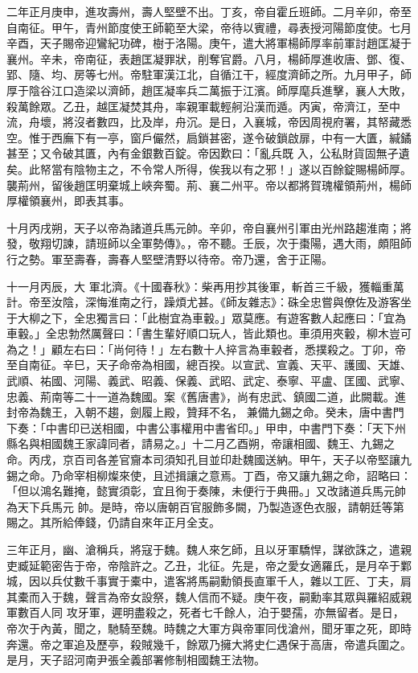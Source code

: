 \begin{pinyinscope}
 二年正月庚申，進攻壽州，壽人堅壁不出。丁亥，帝自霍丘班師。二月辛卯，帝至自南征。甲午，青州節度使王師範至大梁，帝待以賓禮，尋表授河陽節度使。七月辛酉，天子賜帝迎鸞紀功碑，樹于洛陽。庚午，遣大將軍楊師厚率前軍討趙匡凝于襄州。辛未，帝南征，表趙匡凝罪狀，削奪官爵。八月，楊師厚進收唐、鄧、復、
 郢、隨、均、房等七州。帝駐軍漢江北，自循江干，經度濟師之所。九月甲子，師厚于陰谷江口造梁以濟師，趙匡凝率兵二萬振于江濱。師厚麾兵進擊，襄人大敗，殺萬餘眾。乙丑，越匡凝焚其舟，率親軍載輕舸沿漢而遁。丙寅，帝濟江，至中流，舟壞，將沒者數四，比及岸，舟沉。是日，入襄城，帝因周視府署，其帑藏悉空。惟于西廡下有一亭，窗戶儼然，扃鎖甚密，遂令破鎖啟扉，中有一大匱，緘鐍甚至；又令破其匱，內有金銀數百錠。帝因歎曰：「亂兵既
 入，公私財貨固無孑遺矣。此帑當有陰物主之，不令常人所得，俟我以有之邪！」遂以百餘錠賜楊師厚。襲荊州，留後趙匡明棄城上峽奔蜀。荊、襄二州平。帝以都將賀瑰權領荊州，楊師厚權領襄州，即表其事。



 十月丙戌朔，天子以帝為諸道兵馬元帥。辛卯，帝自襄州引軍由光州路趨淮南；將發，敬翔切諫，請班師以全軍勢傳》。，帝不聽。壬辰，次于棗陽，遇大雨，頗阻師行之勢。軍至壽春，壽春人堅壁清野以待帝。帝乃還，舍于正陽。



 十一月丙辰，大
 軍北濟。《十國春秋》：柴再用抄其後軍，斬首三千級，獲輜重萬計。帝至汝陰，深悔淮南之行，躁煩尤甚。《師友雜志》：硃全忠嘗與僚佐及游客坐于大柳之下，全忠獨言曰：「此樹宜為車轂。」眾莫應。有遊客數人起應曰：「宜為車轂。」全忠勃然厲聲曰：「書生輩好順口玩人，皆此類也。車須用夾轂，柳木豈可為之！」顧左右曰：「尚何待！」左右數十人捽言為車轂者，悉撲殺之。丁卯，帝至自南征。辛巳，天子命帝為相國，總百揆。以宣武、宣義、天平、護國、天雄、武順、祐國、河陽、義武、昭義、保義、武昭、武定、泰寧、平盧、匡國、武寧、忠義、荊南等二十一道為魏國。案《舊唐書》，尚有忠武、鎮國二道，此闕載。進封帝為魏王，入朝不趨，劍履上殿，贊拜不名，
 兼備九錫之命。癸未，唐中書門下奏：「中書印已送相國，中書公事權用中書省印。」甲申，中書門下奏：「天下州縣名與相國魏王家諱同者，請易之。」十二月乙酉朔，帝讓相國、魏王、九錫之命。丙戌，京百司各差官齎本司須知孔目並印赴魏國送納。甲午，天子以帝堅讓九錫之命。乃命宰相柳燦來使，且述揖讓之意焉。丁酉，帝又讓九錫之命，詔略曰：「但以鴻名難掩，懿實須彰，宜且徇于奏陳，未便行于典冊。」又改諸道兵馬元帥為天下兵馬元
 帥。是時，帝以唐朝百官服飾多闕，乃製造逐色衣服，請朝廷等第賜之。其所給俸錢，仍請自來年正月全支。



 三年正月，幽、滄稱兵，將寇于魏。魏人來乞師，且以牙軍驕悍，謀欲誅之，遣親吏臧延範密告于帝，帝陰許之。乙丑，北征。先是，帝之愛女適羅氏，是月卒于鄴城，因以兵仗數千事實于橐中，遣客將馬嗣勳領長直軍千人，雜以工匠、丁夫，肩其橐而入于魏，聲言為帝女設祭，魏人信而不疑。庚午夜，嗣勳率其眾與羅紹威親軍數百人同
 攻牙軍，遲明盡殺之，死者七千餘人，泊于嬰孺，亦無留者。是日，帝次于內黃，聞之，馳騎至魏。時魏之大軍方與帝軍同伐滄州，聞牙軍之死，即時奔還。帝之軍追及歷亭，殺賊幾千，餘眾乃擁大將史仁遇保于高唐，帝遣兵圍之。是月，天子詔河南尹張全義部署修制相國魏王法物。




\end{pinyinscope}
